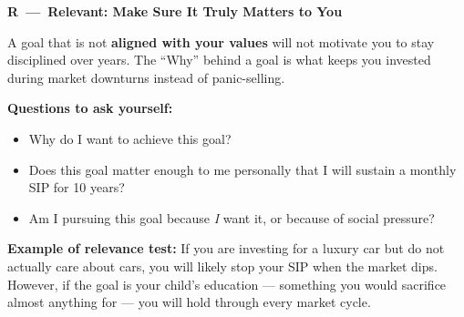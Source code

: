 \documentclass[12pt,a4paper]{article}
\newcommand{\smartheading}[4]{%
  \begingroup
  \setlength{\fboxsep}{4pt}%
  \noindent\colorbox{#1}{%
    \parbox{\dimexpr\linewidth-2\fboxsep\relax}{%
      \Large\bfseries\color{#4}#2\ \normalsize\bfseries---\ #3\strut%
    }%
  }%
  \par\endgroup\medskip
}
\begin{document}
\vspace{3mm}

\begin{tcolorbox}[base, colback=AccentOrange!8, colframe=AccentOrange]
\smartheading{AccentOrange}{R}{Relevant: Make Sure It Truly Matters to You}{white}

A goal that is not \textbf{aligned with your values} will not motivate you to stay disciplined over years. The ``Why'' behind a goal is what keeps you invested during market downturns instead of panic-selling.

\medskip
\textbf{Questions to ask yourself:}
\begin{itemize}
  \item Why do I want to achieve this goal?
  \item Does this goal matter enough to me personally that I will sustain a monthly SIP for 10 years?
  \item Am I pursuing this goal because \textit{I} want it, or because of social pressure?
\end{itemize}

\medskip
\textbf{Example of relevance test:} If you are investing for a luxury car but do not actually care about cars, you will likely stop your SIP when the market dips. However, if the goal is your child's education --- something you would sacrifice almost anything for --- you will hold through every market cycle.
\end{tcolorbox}

\vspace{3mm}
\end{document}

